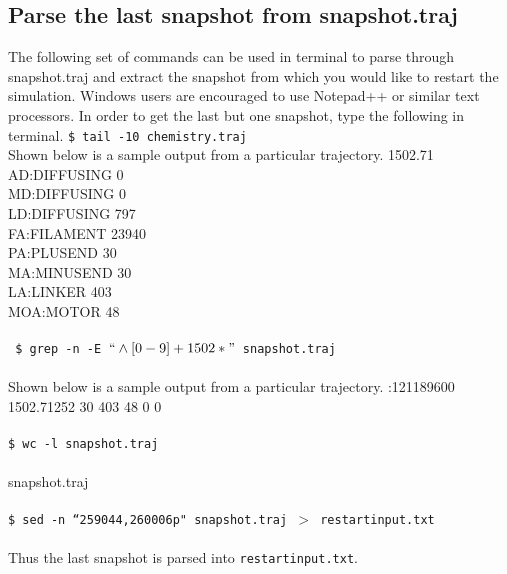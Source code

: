 \documentclass[11pt, oneside]{article}   	%
\begin{document}
\subsection{Parse the last snapshot from snapshot.traj}
The following set of commands can be used in terminal to parse through snapshot.traj and extract the snapshot from which you would like to restart the simulation. Windows users are encouraged to use Notepad++ or similar text processors. 
In order to get the last but one snapshot, type the following in terminal.\newline
\indent \texttt{\$ tail -10 chemistry.traj}\\
Shown below is a sample output from a particular trajectory.
 1502.71 \\
\indent AD:DIFFUSING 0\\
\indent MD:DIFFUSING 0\\
\indent LD:DIFFUSING 797\\
\indent FA:FILAMENT 23940\\
\indent PA:PLUSEND 30\\
\indent MA:MINUSEND 30\\
\indent LA:LINKER 403\\
\indent MOA:MOTOR 48\\
\\
\indent \texttt{ \$ grep -n -E $``\wedge{}[0-9]+ 1502*"$ snapshot.traj}  \\ \\
Shown below is a sample output from a particular trajectory.
:121189600 1502.71252 30 403 48 0 0 \\ \\
\indent \texttt{\$ wc -l snapshot.traj}  \\ \\
 snapshot.traj \\ \\
\indent \texttt{\$ sed -n ``259044,260006p" snapshot.traj $>$ restartinput.txt} \\ \\
Thus the last snapshot is parsed into \texttt{restartinput.txt}.
\end{document}
